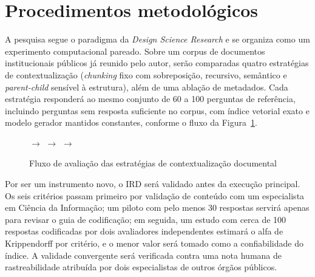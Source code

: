 
\section{Procedimentos metodológicos}

A pesquisa segue o paradigma da \textit{Design Science Research} e se organiza
como um experimento computacional pareado. Sobre um corpus de documentos
institucionais públicos já reunido pelo autor, serão comparadas quatro
estratégias de contextualização (\textit{chunking} fixo com sobreposição,
recursivo, semântico e \textit{parent-child} sensível à estrutura), além de uma
ablação de metadados. Cada estratégia responderá ao mesmo conjunto de 60 a 100
perguntas de referência, incluindo perguntas sem resposta suficiente no corpus,
com índice vetorial exato e modelo gerador mantidos constantes, conforme o fluxo
da Figura~\ref{fig:fluxo-avaliacao}.

\begin{figure}[htb]
  \caption{Fluxo de avaliação das estratégias de contextualização documental}
  \label{fig:fluxo-avaliacao}
  \centering
  $\rightarrow$
  $\rightarrow$
  $\rightarrow$
\end{figure}

Por ser um instrumento novo, o IRD será validado antes da execução principal.
Os seis critérios passam primeiro por validação de conteúdo com um especialista
em Ciência da Informação; um piloto com pelo menos 30 respostas servirá apenas
para revisar o guia de codificação; em seguida, um estudo com cerca de 100
respostas codificadas por dois avaliadores independentes estimará o alfa de
Krippendorff por critério, e o menor valor será tomado como a confiabilidade do
índice. A validade convergente será verificada contra uma nota humana de
rastreabilidade atribuída por dois especialistas de outros órgãos públicos.
